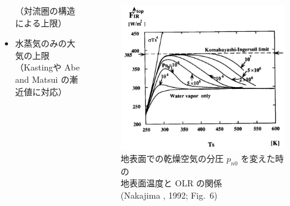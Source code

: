 \documentclass[aspectratio=149,9pt,fleqn]{beamer}
\begin{document}
\begin{frame}
\begin{columns}[T,onlytextwidth]
\begin{column}{.6\textwidth}
\begin{desc}
\begin{itemize}
							（対流圏の構造による上限）
						\item 水蒸気のみの大気の上限\\
							（Kastingや Abe and Matsui の漸近値に対応）
					\end{itemize}
			\end{desc}
		\end{column}
		\begin{column}{.38\textwidth}
			\begin{figure}
				\scriptsize
				\includegraphics[width=\textwidth]{nf6.png}\\
				地表面での乾燥空気の分圧 \(p_{n0}\) を変えた時の\\
				地表面温度と OLR の関係\\
				(Nakajima \etal*, 1992; Fig.\ 6)
			\end{figure}
		\end{column}
	\end{columns}
\end{frame}
\end{document}
